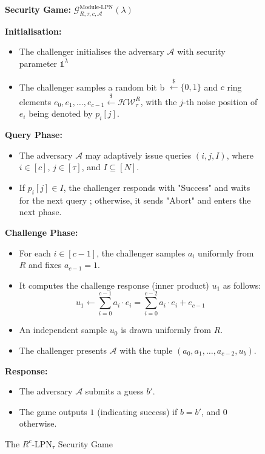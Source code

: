 \begin{figure}[t]
    \begin{mdframed}[nobreak=true]
        \begin{center}
            \textbf{Security Game:} $\mathcal{G}_{R, \tau, c,\mathcal{A}}^{\text{Module-LPN}}(\lambda)$\\
        \end{center}

        \textbf{Initialisation:}
        \begin{itemize}
            \item The challenger initialises the adversary $\mathcal{A}$ with security parameter $\mathds{1}^{\lambda}$
            \item The challenger samples a random bit b $\stackrel{\$}{\leftarrow} \{0,1\}$ and $c$ ring elements $e_{0}, e_{1}, \ldots, e_{c-1} \stackrel{\$}{\leftarrow} \mathcal{H} \mathcal{W}_{\tau}^{R}$, with the $j$-th noise position of $e_i$ being denoted by $p_{i}[j]$.
        \end{itemize}
        
        \textbf{Query Phase:}
        \begin{itemize}
            \item The adversary $\mathcal{A}$ may adaptively issue queries $(i, j, I)$, where $i \in [c]$, $j \in [\tau]$, and $I \subseteq [N]$.
            \item If $p_{i}[j] \in I$, the challenger responds with "Success" and waits for the next query ; otherwise, it sends "Abort" and enters the next phase.
        \end{itemize}

        \textbf{Challenge Phase:}
        \begin{itemize}
            \item For each $i \in [c-1]$, the challenger samples $a_{i}$ uniformly from $R$ and fixes $a_{c-1} = 1$.
            \item It computes the challenge response (inner product) $u_{1}$ as follows:
            $$
            u_{1} \leftarrow \sum_{i=0}^{c-1} a_{i} \cdot e_{i} = \sum_{i=0}^{c-2} a_{i} \cdot e_{i} + e_{c-1}
            $$
            \item An independent sample $u_{0}$ is drawn uniformly from $R$.
            \item The challenger presents $\mathcal{A}$ with the tuple $\left(a_{0}, a_{1}, \ldots, a_{c-2}, u_{b}\right)$.
        \end{itemize}

        \textbf{Response:}
        \begin{itemize}
            \item The adversary $\mathcal{A}$ submits a guess $b'$.
            \item The game outputs $1$ (indicating success) if $b = b'$, and $0$ otherwise.
        \end{itemize}
    \end{mdframed}
    \caption{The $R^{c}$-LPN$_{\tau}$ Security Game}
    \label{fig:module-lpn-game}
\end{figure}

